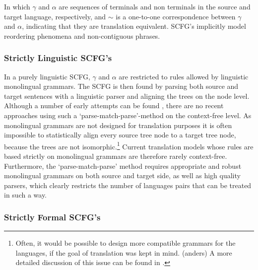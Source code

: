 \documentclass{report}
\theoremstyle{definition}
\theoremstyle{plain}
\begin{document}
In which $\gamma$ and $\alpha$ are sequences of terminals and non terminals in the source and target language, respectively, and $\sim$ is a one-to-one correspondence between $\gamma$ and $\alpha$, indicating that they are translation equivalent. SCFG's implicitly model reordering phenomena and non-contiguous phrases.

\subsubsection{Strictly Linguistic SCFG's}

In a purely linguistic SCFG, $\gamma$ and $\alpha$ are restricted to rules allowed by linguistic monolingual grammars. The SCFG is then found by parsing both source and target sentences with a linguistic parser and aligning the trees on the node level. Although a number of early attempts can be found \citep[see][p. 20]{wu1997stochastic}, there are no recent approaches using such a `parse-match-parse'-method on the context-free level. As monolingual grammars are not designed for translation purposes it is often impossible to statistically align every source tree node to a target tree node, because the trees are not isomorphic.\footnote{Often, it would be possible to design more compatible grammars for the languages, if the goal of translation was kept in mind. (anders) A more detailed discussion of this issue can be found in \cite{rosetta1994compositional}.} Current translation models whose rules are based strictly on monolingual grammars are therefore rarely context-free. Furthermore, the `parse-match-parse' method requires appropriate and robust monolingual grammars on both source and target side, as well as high quality parsers, which clearly restricts the number of languages pairs that can be treated in such a way.

\subsubsection{Strictly Formal SCFG's}
\end{document}
